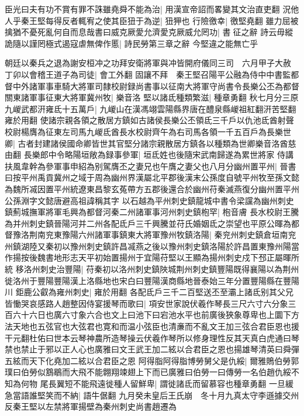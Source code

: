 臣光曰夫有功不賞有罪不誅雖堯舜不能為治|{
	用漢宣帝詔而畧變其文治直吏翻}
況他人乎秦王堅每得反者輒宥之使其臣狃于為逆|{
	狃狎也}
行險徼幸|{
	徼堅堯翻}
雖力屈被擒猶不憂死亂何自而息哉書曰威克厥愛允濟愛克厥威允罔功|{
	書征之辭}
詩云毋縱詭隨以謹罔極式遏寇虐無俾作慝|{
	詩民勞第三章之辭}
今堅違之能無亡乎

朝廷以秦兵之退為謝安桓冲之功拜安衛將軍與冲皆開府儀同三司　六月甲子大赦　丁卯以會稽王道子為司徒|{
	會工外翻}
固讓不拜　秦王堅召陽平公融為侍中中書監都督中外諸軍事車騎大將軍司隸校尉録尚書事以征南大將軍守尚書令長樂公丕為都督關東諸軍事征東大將軍冀州牧|{
	樂音洛}
堅以諸氐種類繁滋|{
	種章勇翻}
秋七月分三原九嵕武都汧雍氐十五萬戶|{
	九嵕山在漢馮翊雲陽縣界唐在醴泉縣嵕祖紅翻汧苦堅翻雍於用翻}
使諸宗親各領之散居方鎮如古諸侯長樂公丕領氐三千戶以仇池氐酋射聲校尉楊膺為征東左司馬九嵕氐酋長水校尉齊午為右司馬各領一千五百戶為長樂世卿|{
	古者封建諸侯國命卿皆世其官堅分諸宗親散居方鎮各以種類為世卿樂音洛酋慈由翻}
長樂郎中令略陽垣敞為録事參軍|{
	垣氐姓也後隨宋武南歸遂為累世將家}
侍講扶風韋幹為參軍事申紹為别駕膺丕之妻兄也午膺之妻父也八月分幽州置平州|{
	晉書曰按平州禹貢冀州之域于周為幽州界漢屬北平郡後漢末公孫度自號平州牧至孫文懿為魏所㓕因置平州統遼東昌黎玄菟帶方五郡後還合於幽州苻秦滅燕復分幽州置平州公孫淵字文懿唐避高祖諱稱其字}
以石越為平州刺史鎮龍城中書令梁讜為幽州刺史鎮薊城撫軍將軍毛興為都督河秦二州諸軍事河州刺史鎮枹罕|{
	枹音膚}
長水校尉王騰為并州刺史鎮晉陽河并二州各配氐戶三千興騰並苻氏婚姻氐之崇望也平原公暉為都督豫洛荆南兖東豫陽六州諸軍事鎮東大將軍豫州牧鎮洛陽|{
	秦兖州刺史鎮倉垣南兖州鎮湖陸又秦初以豫州刺史鎮許昌㓕燕之後以豫州刺史鎮洛陽於許昌置東豫州陽當作揚按後魏書地形志天平初始置揚州于宜陽苻堅以王顯為揚州刺史戍下邳正屬暉所統}
移洛州刺史治豐陽|{
	苻秦初以洛州刺史鎮陜城荆州刺史鎮豐陽既得襄陽以為荆州徙洛州于豐陽豐陽漢上洛縣地也宋白曰豐陽漢商縣地晉泰始三年分置豐陽縣在豐陽川}
鉅鹿公叡為雍州刺史|{
	雍於用翻}
各配氐戶三千二百堅送丕至灞上諸氐别其父兄皆慟哭哀感路人趙整因侍宴援琴而歌曰|{
	項安世家說伏羲作琴長三尺六寸六分象三百六十六日也廣六寸象六合也文上曰池下曰宕池水平也前廣後狹象尊卑也上圜下方法天地也五弦官也大弦君也寛和而温小弦臣也清亷而不亂文王加三弦合君臣恩也援干元翻杜佑曰世本云琴神農所造琴操云伏羲作琴所以修身理性反其天真白虎通曰琴禁也禁止于邪以正人心也廣雅曰文王武王加二絃以合君臣之恩也揚雄琴清英曰舜彈五絃而天下化堯加二絃以合君臣之恩}
阿得脂阿得脂博勞舅父是仇綏|{
	爾雅鵙伯勞郭璞曰伯勞似鶷鶡而大飛不能翺翔竦翅上下而已廣雅曰伯勞一曰傳勞一名伯趙仇綏不知為何物}
尾長翼短不能飛遠徙種人留鮮卑|{
	謂徙諸氐而留慕容也種章勇翻}
一旦緩急當語誰堅笑而不納|{
	語牛倨翻}
九月癸未皇后王氏崩　冬十月九真太守李遜據交州反秦王堅以左禁將軍揚壁為秦州刺史尚書趙遷為

